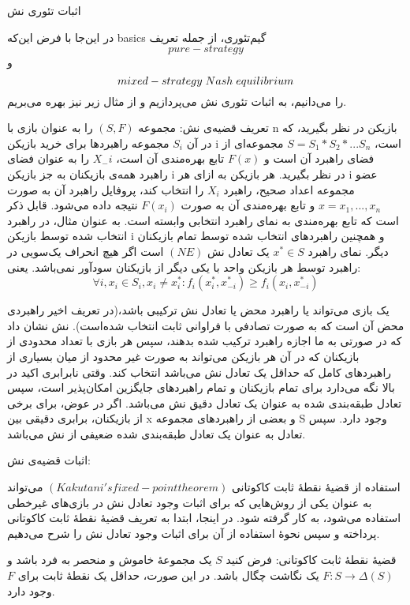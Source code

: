 اثبات تئوری نش


در این‌جا با فرض این‌که basics گیم‌تئوری، از جمله تعریف
$$pure-strategy$$
و
$$mixed-strategy
\hspace*{0.1cm}
Nash
\hspace*{0.1cm}
equilibrium$$
را می‌دانیم، به اثبات تئوری نش می‌پردازیم و از مثال زیر نیز بهره می‌بریم.

تعریف قضیه‌ی نش: مجموعه
$(S, F)$
را به عنوان بازی با n بازیکن در نظر بگیرید، که در آن
$S_i$
مجموعه راهبردها برای خرید بازیکن i است،
$S = S_1 * S_2 * ... S_n$
مجموعه‌ای از فضای راهبرد آن است و
$F(x)$
تابع بهره‌مندی آن است،
$X_-i$
را به عنوان فضای راهبرد همه‌ی بازیکنان به جز بازیکن i در نظر بگیرید. هر بازیکن به ازای هر i عضو مجموعه اعداد صحیح، راهبرد
$X_i$
را انتخاب کند، پروفایل راهبرد آن به صورت
$x = x_1, ..., x_n$
و تابع بهره‌مندی آن به صورت
$F(x_i)$
نتیجه داده می‌شود. قابل ذکر است که تابع بهره‌مندی به نمای راهبرد انتخابی وابسته است. به عنوان مثال، در راهبرد انتخاب شده توسط بازیکن i و همچنین راهبردهای انتخاب شده توسط تمام بازیکنان دیگر. نمای راهبرد
$x^* \in S$
یک تعادل نش
$(NE)$
است اگر هیچ انحراف یک‌سویی در راهبرد توسط هر بازیکن واحد با یکی دیگر از بازیکنان سودآور نمی‌باشد.
یعنی:
$$\forall i, x_i  \in S_i , x_i \neq x_i^* : f_i(x_i^* , x_{-i}^*) \geq f_i(x_i , x_{-i}^*)$$

یک بازی می‌تواند یا راهبرد محض یا تعادل نش ترکیبی باشد،(در تعریف اخیر راهبردی محض آن است که به صورت تصادفی با فراوانی ثابت انتخاب شده‌است). نش نشان داد که در صورتی به ما اجازه راهبرد ترکیب شده بدهند، سپس هر بازی با تعداد محدودی از بازیکنان که در آن هر بازیکن می‌تواند به صورت غیر محدود از میان بسیاری از راهبرد‌های کامل که حداقل یک تعادل نش می‌باشد انتخاب کند. وقتی نابرابری اکید در بالا نگه می‌دارد برای تمام بازیکنان و تمام راهبرد‌های جایگزین امکان‌پذیر است، سپس تعادل طبقه‌بندی شده به عنوان یک تعادل دقیق نش می‌باشد. اگر در عوض، برای برخی از بازیکنان، برابری دقیقی بین x و بعضی از راهبرد‌های مجموعه S وجود دارد. سپس تعادل به عنوان یک تعادل طبقه‌بندی شده ضعیفی از نش می‌باشد.


اثبات قضیه‌ی نش:

استفاده از قضیهٔ نقطهٔ ثابت کاکوتانی 
$(Kakutani's fixed-point theorem)$ 
می‌تواند به عنوان یکی از روش‌هایی که برای اثبات وجود تعادل نش در بازی‌های غیرخطی استفاده می‌شود، به کار گرفته شود. در اینجا، ابتدا به تعریف قضیهٔ نقطهٔ ثابت کاکوتانی پرداخته و سپس نحوهٔ استفاده از آن برای اثبات وجود تعادل نش را شرح می‌دهیم.

قضیهٔ نقطهٔ ثابت کاکوتانی:
فرض کنید $S$ یک مجموعهٔ خاموش و منحصر به فرد باشد و $F : S \rightarrow \Delta(S)$ یک نگاشت چگال باشد. در این صورت، حداقل یک نقطهٔ ثابت برای $F$ وجود دارد.

